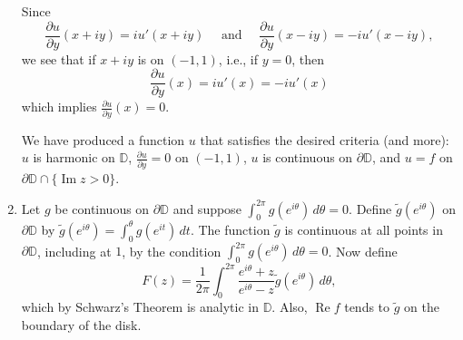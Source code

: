 \documentclass[11pt]{book}
\theoremstyle{definition}
\renewcommand{\Re}{\operatorname{Re}}
\renewcommand{\Im}{\operatorname{Im}}
\begin{document}
\begin{enumerate}
            Since \[ \frac{\partial u}{\partial y}(x+iy) = i u'(x+iy)  \quad \text{ and } \quad \frac{\partial u}{\partial y} (x-iy) = -i u'(x-iy), \]  we see that if $x+iy$ is on $(-1,1)$, i.e., if $y=0$, then 
            \[ \frac{\partial u}{\partial y}(x) = i u'(x) = -i u'(x) \] which implies $\frac{\partial u}{\partial y}(x) = 0$. 

            We have produced a function $u$ that satisfies the desired criteria (and more): $u$ is harmonic on $\mathbb D$, $\frac{\partial u}{\partial y} = 0$ on $(-1,1)$, $u$ is continuous on $\partial \mathbb D$, and $u=f$ on $\partial \mathbb D \cap \{ \Im z > 0 \}$. 
            
          \item Let $g$ be continuous on $\partial \mathbb D$ and suppose $\int_0^{2\pi} g(e^{i\theta}) \, d\theta = 0$.  Define $\widetilde g(e^{i\theta})$ on $\partial \mathbb D$ by $\widetilde g(e^{i\theta}) = \int_0^{\theta} g(e^{it}) \, dt$.  The function $\widetilde g$ is continuous at all points in $\partial \mathbb D$, including at $1$, by the condition $\int_0^{2\pi} g(e^{i\theta}) \, d\theta = 0$.  Now define 
            \[ F(z) = \frac{1}{2\pi} \int_0^{2\pi} \frac{e^{i\theta} + z}{e^{i\theta} - z} \widetilde g(e^{i\theta}) \, d\theta, \]  which by Schwarz's Theorem is analytic in $\mathbb D$.  Also, $\Re f$ tends to $\widetilde g$ on the boundary of the disk.  
            

\end{enumerate}
\end{document}
